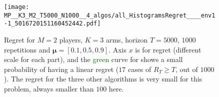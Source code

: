 %
%
\begin{figure}[!t]
  \centering
      \texttt{[image: MP\_\_K3\_M2\_T5000\_N1000\_\_4\_algos/all\_HistogramsRegret\_\_\_\_env1-1\_5016720151160452442.pdf]}
  \caption[Failure case of \Selfish]{Regret for $M=2$ players, $K=3$ arms, horizon $T=5000$, $1000$ repetitions and $\boldsymbol{\mu} = [0.1, 0.5, 0.9]$. Axis $x$ is for regret (different scale for each part), and the \textcolor{darkgreen}{green} curve for \Selfish{} shows a small probability of having a linear regret ($17$ cases of $R_T \geq T$, out of $1000$). The regret for the three other algorithms is very small for this problem, always smaller than $100$ here.}
  \label{fig:5:selfish_fail1}
\end{figure}



